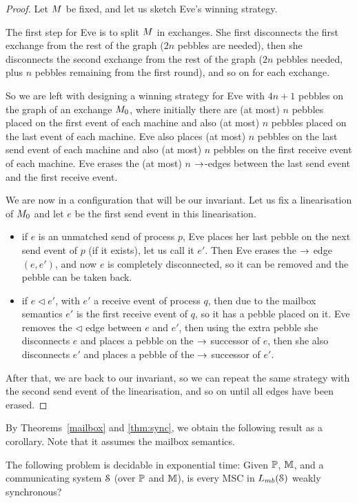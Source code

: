 \documentclass[a4paper,UKenglish,cleveref, autoref, thm-restate]{lipics-v2021}
\begin{document}
\begin{proof}
Let $M$ be fixed, and let us sketch Eve's winning strategy.

The first step for Eve is to split $M$ in exchanges. She first disconnects
the first exchange from the rest of the graph ($2n$ pebbles are needed),
then she disconnects the second exchange from the rest of the graph ($2n$ pebbles needed, plus $n$ pebbles remaining from the first round), and so on for
each exchange.

So we are left with designing a winning strategy for Eve with $4n+1$ pebbles
on the graph of an exchange $M_0$,
where initially there are (at most) $n$ pebbles
placed on the first event of each machine and also (at most) $n$ pebbles placed
on the last event of each machine. Eve also places (at most) $n$ pebbles on the last
send event of each machine and also (at most) $n$ pebbles on the first receive event of
each machine. Eve erases the (at most) $n$ $\to$-edges between the last send event and the first receive event.

We are now in a configuration that will be our invariant.
Let us fix a linearisation of $M_0$
and let $e$ be the first send event in this linearisation.
\begin{itemize}
\item if $e$ is an unmatched send of process $p$,
Eve places her last pebble on the next
send event of $p$ (if it exists), let us call it $e'$. Then Eve erases the
$\to$ edge $(e,e')$, and now $e$ is completely disconnected,
so it can be removed and the pebble can be taken back.
\item if $e\lhd e'$, with $e'$ a receive event of process $q$,
then due to the mailbox semantics $e'$ is the first receive event of $q$,
so it has a pebble placed on it. Eve removes the $\lhd$ edge between
$e$ and $e'$, then using the extra pebble she disconnects $e$ and places a
pebble on the $\to$ successor of $e$, then she also
disconnects $e'$ and places a pebble of the $\to$ successor of $e'$.
\end{itemize}
After that, we are back to our invariant, so we can repeat the same
strategy with the second send event of the linearisation, and so on until
all edges have been erased.
\end{proof}


By Theorems~\ref{mailbox} and \ref{thm:sync}, we obtain the following result as a corollary.
Note that it assumes the mailbox semantics.

\begin{theorem}\label{thm:mailbox-weak-sync}
The following problem is decidable in exponential time:
Given $\mathbb{P}$, $\mathbb{M}$, and a communicating system $\mathcal{S}$ (over $\mathbb{P}$ and $\mathbb{M}$), is every MSC in $\mbL{\System}$ weakly synchronous?
\end{theorem}
\end{document}
